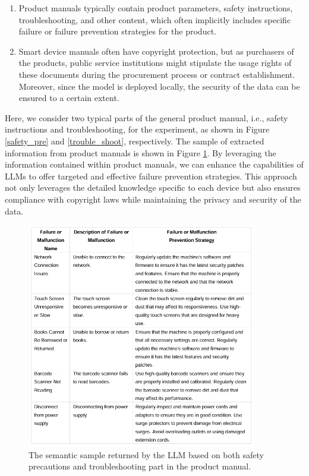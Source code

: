 \documentclass[preprint,12pt]{elsarticle}
\begin{document}
\begin{enumerate}
	\item Product manuals typically contain product parameters, safety instructions, troubleshooting, and other content, which often implicitly includes specific failure or failure prevention strategies for the product.
	\item Smart device manuals often have copyright protection, but as purchasers of the products, public service institutions might stipulate the usage rights of these documents during the procurement process or contract establishment. Moreover, since the model is deployed locally, the security of the data can be ensured to a certain extent.
\end{enumerate}
Here, we consider two typical parts of the general product manual, i.e., safety instructions and troubleshooting, for the experiment, as shown in Figure \ref{safety_pre} and \ref{trouble_shoot}, respectively.
The sample of extracted information from product manuals is shown in Figure \ref{failure_prev}.
By leveraging the information contained within product manuals, we can enhance the capabilities of LLMs to offer targeted and effective failure prevention strategies. This approach not only leverages the detailed knowledge specific to each device but also ensures compliance with copyright laws while maintaining the privacy and security of the data.
\begin{figure}[h]
	\centering
	\includegraphics[width=10cm]{failure_prev.png}
	\caption{The semantic sample returned by the LLM based on both safety precautions and troubleshooting part in the product manual.}
	\label{failure_prev}
\end{figure}
\end{document}
